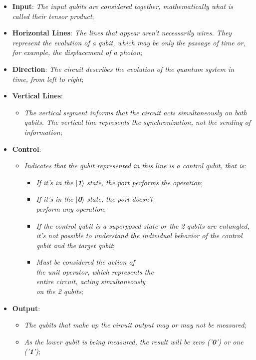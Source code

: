 \documentclass[conference]{IEEEtran}
\begin{document}
\begin{itemize}
    \item \textbf{Input}: \textit{The input qubits are considered together, mathematically what is called their tensor product};
    \item \textbf{Horizontal Lines}: \textit{The lines that appear aren't necessarily wires. They represent the evolution of a qubit, which may be only the passage of time or, for example, the displacement of a photon};
    \item \textbf{Direction}: \textit{The circuit describes the evolution of the quantum system in time, from left to right};
    \item \textbf{Vertical Lines}:
    \begin{itemize}
        \item \textit{The vertical segment informs that the circuit acts simultaneously on both qubits. The vertical line represents the synchronization, not the sending of information};
    \end{itemize}
    \item \textbf{Control}:
    \begin{itemize}
        \item \textit{Indicates that the qubit represented in this line is a control qubit, that is}:
        \begin{itemize}
            \item \textit{If it's in the \textbf{$\mid$1$\rangle$} state, the port performs the operation};
            \item \textit{If it's in the \textbf{$\mid$0$\rangle$} state, the port doesn't \\perform any operation};
            \item \textit{If the control qubit is a superposed state or the 2 qubits are entangled, it's not possible to understand the individual behavior of the control qubit and the target qubit};
            \item \textit{Must be considered the action of \\the unit operator, which represents the \\entire circuit, acting simultaneously \\on the 2 qubits};
        \end{itemize}
    \end{itemize}
    \item \textbf{Output}:
    \begin{itemize}
        \item \textit{The qubits that make up the circuit output may or may not be measured};
        \item \textit{As the lower qubit is being measured, the result will be zero ('\textbf{0}') or one ('\textbf{1}')};
    \end{itemize}
\end{itemize}
\end{document}
